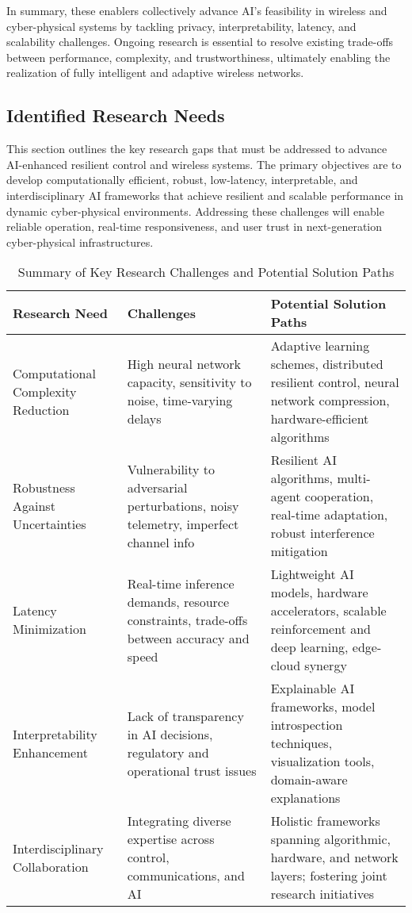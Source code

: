 \documentclass[sigconf]{acmart}
\begin{document}
In summary, these enablers collectively advance AI's feasibility in wireless and cyber-physical systems by tackling privacy, interpretability, latency, and scalability challenges. Ongoing research is essential to resolve existing trade-offs between performance, complexity, and trustworthiness, ultimately enabling the realization of fully intelligent and adaptive wireless networks.

\subsection{Identified Research Needs}

This section outlines the key research gaps that must be addressed to advance AI-enhanced resilient control and wireless systems. The primary objectives are to develop computationally efficient, robust, low-latency, interpretable, and interdisciplinary AI frameworks that achieve resilient and scalable performance in dynamic cyber-physical environments. Addressing these challenges will enable reliable operation, real-time responsiveness, and user trust in next-generation cyber-physical infrastructures.

\begin{table*}[htbp]
\centering
\caption{Summary of Key Research Challenges and Potential Solution Paths}
\label{tab:research_needs}
\begin{adjustbox}{max width=\textwidth}
\begin{tabular}{@{}lll@{}}
\toprule
\textbf{Research Need} & \textbf{Challenges} & \textbf{Potential Solution Paths} \\ \midrule
Computational Complexity Reduction & High neural network capacity, sensitivity to noise, time-varying delays & Adaptive learning schemes, distributed resilient control, neural network compression, hardware-efficient algorithms~\cite{ref46} \\
Robustness Against Uncertainties & Vulnerability to adversarial perturbations, noisy telemetry, imperfect channel info & Resilient AI algorithms, multi-agent cooperation, real-time adaptation, robust interference mitigation~\cite{ref48} \\
Latency Minimization & Real-time inference demands, resource constraints, trade-offs between accuracy and speed & Lightweight AI models, hardware accelerators, scalable reinforcement and deep learning, edge-cloud synergy~\cite{ref50} \\
Interpretability Enhancement & Lack of transparency in AI decisions, regulatory and operational trust issues & Explainable AI frameworks, model introspection techniques, visualization tools, domain-aware explanations \\
Interdisciplinary Collaboration & Integrating diverse expertise across control, communications, and AI & Holistic frameworks spanning algorithmic, hardware, and network layers; fostering joint research initiatives \\ \bottomrule
\end{tabular}
\end{adjustbox}
\end{table*}
\end{document}
